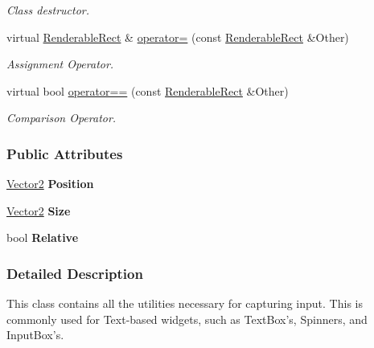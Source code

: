 \begin{DoxyCompactItemize}
\begin{DoxyCompactList}\small\item\em Class destructor. \item\end{DoxyCompactList}\item 
virtual \hyperlink{structphys_1_1UI_1_1RenderableRect}{RenderableRect} \& \hyperlink{structphys_1_1UI_1_1RenderableRect_adc996ec81f9bf70e3ab449590844fa5f}{operator=} (const \hyperlink{structphys_1_1UI_1_1RenderableRect}{RenderableRect} \&Other)
\begin{DoxyCompactList}\small\item\em Assignment Operator. \item\end{DoxyCompactList}\item 
virtual bool \hyperlink{structphys_1_1UI_1_1RenderableRect_a9ef5287e50873874eade161f9356e95d}{operator==} (const \hyperlink{structphys_1_1UI_1_1RenderableRect}{RenderableRect} \&Other)
\begin{DoxyCompactList}\small\item\em Comparison Operator. \item\end{DoxyCompactList}\end{DoxyCompactItemize}
\subsubsection*{Public Attributes}
\begin{DoxyCompactItemize}
\item 
\hypertarget{structphys_1_1UI_1_1RenderableRect_abe9af45af2ae0fdd6e6a1cb08151893d}{
\hyperlink{classphys_1_1Vector2}{Vector2} {\bfseries Position}}
\label{structphys_1_1UI_1_1RenderableRect_abe9af45af2ae0fdd6e6a1cb08151893d}

\item 
\hypertarget{structphys_1_1UI_1_1RenderableRect_adb0734b93ab4c89a522bca5e20593edc}{
\hyperlink{classphys_1_1Vector2}{Vector2} {\bfseries Size}}
\label{structphys_1_1UI_1_1RenderableRect_adb0734b93ab4c89a522bca5e20593edc}

\item 
\hypertarget{structphys_1_1UI_1_1RenderableRect_a00b0874fd4d368f4ec1a6cd06dd81f46}{
bool {\bfseries Relative}}
\label{structphys_1_1UI_1_1RenderableRect_a00b0874fd4d368f4ec1a6cd06dd81f46}

\end{DoxyCompactItemize}


\subsubsection{Detailed Description}
This class contains all the utilities necessary for capturing input. This is commonly used for Text-\/based widgets, such as TextBox's, Spinners, and InputBox's. 

